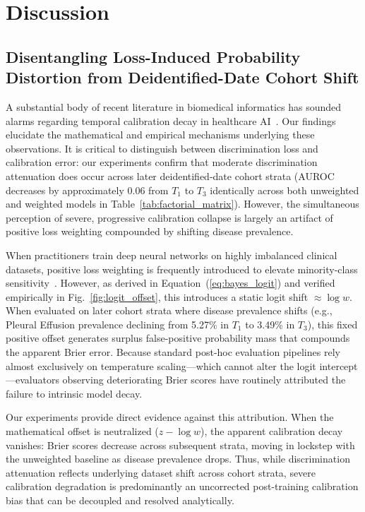 \documentclass[preprint,12pt]{elsarticle}
\begin{document}
\section{Discussion}

\subsection{Disentangling Loss-Induced Probability Distortion from Deidentified-Date Cohort Shift}
A substantial body of recent literature in biomedical informatics has sounded alarms regarding temporal calibration decay in healthcare AI~\cite{guo2022evaluation, hinson2022multisite}. Our findings elucidate the mathematical and empirical mechanisms underlying these observations. It is critical to distinguish between discrimination loss and calibration error: our experiments confirm that moderate discrimination attenuation does occur across later deidentified-date cohort strata (AUROC decreases by approximately $0.06$ from $T_1$ to $T_3$ identically across both unweighted and weighted models in Table~\ref{tab:factorial_matrix}). However, the simultaneous perception of severe, progressive calibration collapse is largely an artifact of positive loss weighting compounded by shifting disease prevalence.

When practitioners train deep neural networks on highly imbalanced clinical datasets, positive loss weighting is frequently introduced to elevate minority-class sensitivity~\cite{rajpurkar2017chexnet}. However, as derived in Equation~(\ref{eq:bayes_logit}) and verified empirically in Fig.~\ref{fig:logit_offset}, this introduces a static logit shift $\approx \log w$. When evaluated on later cohort strata where disease prevalence shifts (e.g., Pleural Effusion prevalence declining from 5.27\% in $T_1$ to 3.49\% in $T_3$), this fixed positive offset generates surplus false-positive probability mass that compounds the apparent Brier error. Because standard post-hoc evaluation pipelines rely almost exclusively on temperature scaling---which cannot alter the logit intercept---evaluators observing deteriorating Brier scores have routinely attributed the failure to intrinsic model decay.

Our experiments provide direct evidence against this attribution. When the mathematical offset is neutralized ($z - \log w$), the apparent calibration decay vanishes: Brier scores decrease across subsequent strata, moving in lockstep with the unweighted baseline as disease prevalence drops. Thus, while discrimination attenuation reflects underlying dataset shift across cohort strata, severe calibration degradation is predominantly an uncorrected post-training calibration bias that can be decoupled and resolved analytically.
\end{document}
